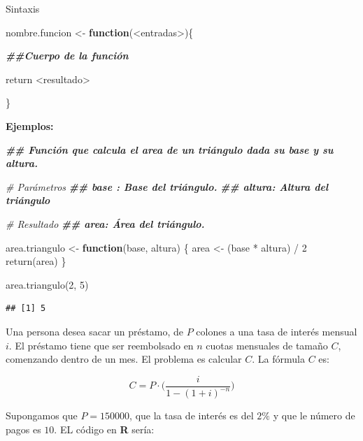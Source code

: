 \documentclass[
  12pt,
]{book}
\newenvironment{Shaded}{\begin{snugshade}}{\end{snugshade}}
\newcommand{\CommentTok}[1]{\textcolor[rgb]{0.56,0.35,0.01}{\textit{#1}}}
\newcommand{\ControlFlowTok}[1]{\textcolor[rgb]{0.13,0.29,0.53}{\textbf{#1}}}
\newcommand{\DecValTok}[1]{\textcolor[rgb]{0.00,0.00,0.81}{#1}}
\newcommand{\DocumentationTok}[1]{\textcolor[rgb]{0.56,0.35,0.01}{\textbf{\textit{#1}}}}
\newcommand{\FunctionTok}[1]{\textcolor[rgb]{0.00,0.00,0.00}{#1}}
\newcommand{\NormalTok}[1]{#1}
\newcommand{\OtherTok}[1]{\textcolor[rgb]{0.56,0.35,0.01}{#1}}
\newcommand{\SpecialCharTok}[1]{\textcolor[rgb]{0.00,0.00,0.00}{#1}}
\begin{document}
Sintaxis

\begin{Shaded}
\begin{Highlighting}[]
\NormalTok{nombre.funcion }\OtherTok{\textless{}{-}} \ControlFlowTok{function}\NormalTok{(}\SpecialCharTok{\textless{}}\NormalTok{entradas}\SpecialCharTok{\textgreater{}}\NormalTok{)\{}
  
  \DocumentationTok{\#\#Cuerpo de la función}
  
\NormalTok{  return }\SpecialCharTok{\textless{}}\NormalTok{resultado}\SpecialCharTok{\textgreater{}}
  
\NormalTok{\}}
\end{Highlighting}
\end{Shaded}

\textbf{Ejemplos:}

\begin{Shaded}
\begin{Highlighting}[]
\DocumentationTok{\#\# Función que calcula el area de un triángulo dada su base y su altura.}


\CommentTok{\# Parámetros}
\DocumentationTok{\#\# base : Base del triángulo.}
\DocumentationTok{\#\# altura: Altura del triángulo}

\CommentTok{\# Resultado}
\DocumentationTok{\#\# area: Área del triángulo.}

\NormalTok{area.triangulo }\OtherTok{\textless{}{-}} \ControlFlowTok{function}\NormalTok{(base, altura) \{}
\NormalTok{  area }\OtherTok{\textless{}{-}}\NormalTok{ (base }\SpecialCharTok{*}\NormalTok{ altura) }\SpecialCharTok{/} \DecValTok{2}
  \FunctionTok{return}\NormalTok{(area)}
\NormalTok{\}}

\FunctionTok{area.triangulo}\NormalTok{(}\DecValTok{2}\NormalTok{, }\DecValTok{5}\NormalTok{)}
\end{Highlighting}
\end{Shaded}

\begin{verbatim}
## [1] 5
\end{verbatim}

Una persona desea sacar un préstamo, de \(P\) colones a una tasa de interés mensual \(i\). El préstamo tiene que ser reembolsado en \(n\) cuotas mensuales de tamaño \(C\), comenzando dentro de un mes. El problema es calcular \(C\). La fórmula \(C\) es:

\[
C = P\cdot\bigg(\dfrac{i}{1-(1+i)^{-n}}\bigg)
\]

Supongamos que \(P=150000\), que la tasa de interés es del \(2\%\) y que le número de pagos es \(10\). EL código en \textbf{R} sería:
\end{document}
